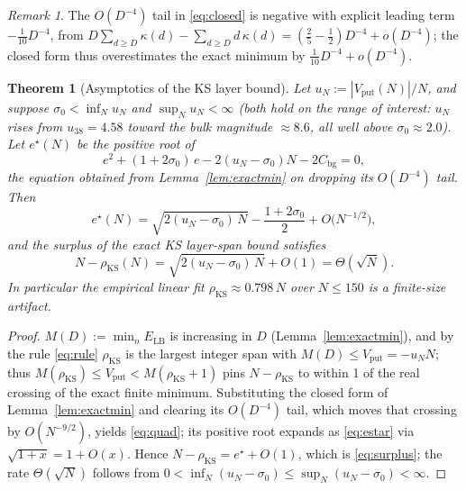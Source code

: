 \documentclass[11pt]{article}
\newtheorem{theorem}{Theorem}
\theoremstyle{remark}
\newtheorem{remark}{Remark}
\newcommand{\LB}{\mathrm{LB}}
\newcommand{\bg}{\mathrm{bg}}
\newcommand{\KS}{\mathrm{KS}}
\newcommand{\vput}{\mathrm{put}}
\begin{document}
\begin{remark}\label{rem:tail}
The $O(D^{-4})$ tail in \eqref{eq:closed} is negative with explicit leading term $-\tfrac1{10}D^{-4}$, from $D\sum_{d\ge D}\kappa(d)-\sum_{d\ge D} d\,\kappa(d)=(\tfrac25-\tfrac12)D^{-4}+o(D^{-4})$; the closed form thus overestimates the exact minimum by $\tfrac1{10}D^{-4}+o(D^{-4})$.
\end{remark}

\begin{theorem}[Asymptotics of the KS layer bound]\label{thm:asym}
Let $u_N:=|V_\vput(N)|/N$, and suppose $\sigma_0<\inf_N u_N$ and $\sup_N u_N<\infty$ (both hold on the range of interest: $u_N$ rises from $u_{38}=4.58$ toward the bulk magnitude $\approx8.6$, all well above $\sigma_0\approx2.0$). Let $e^\star(N)$ be the positive root of
\begin{equation}\label{eq:quad}
e^2 + (1+2\sigma_0)\,e - 2(u_N-\sigma_0)N - 2C_\bg = 0,
\end{equation}
the equation obtained from Lemma~\ref{lem:exactmin} on dropping its $O(D^{-4})$ tail. Then
\begin{equation}\label{eq:estar}
e^\star(N) = \sqrt{2(u_N-\sigma_0)\,N} - \frac{1+2\sigma_0}2 + O\bigl(N^{-1/2}\bigr),
\end{equation}
and the surplus of the exact KS layer-span bound satisfies
\begin{equation}\label{eq:surplus}
N-\rho_\KS(N) = \sqrt{2(u_N-\sigma_0)\,N} + O(1) = \Theta(\sqrt N).
\end{equation}
In particular the empirical linear fit $\rho_\KS\approx0.798\,N$ over $N\le150$ is a finite-size artifact.
\end{theorem}

\begin{proof}
$M(D):=\min_n E_\LB$ is increasing in $D$ (Lemma~\ref{lem:exactmin}), and by the rule \eqref{eq:rule} $\rho_\KS$ is the largest integer span with $M(D)\le V_\vput=-u_N N$; thus $M(\rho_\KS)\le V_\vput<M(\rho_\KS+1)$ pins $N-\rho_\KS$ to within 1 of the real crossing of the exact finite minimum. Substituting the closed form of Lemma~\ref{lem:exactmin} and clearing its $O(D^{-4})$ tail, which moves that crossing by $O(N^{-9/2})$, yields \eqref{eq:quad}; its positive root expands as \eqref{eq:estar} via $\sqrt{1+x}=1+O(x)$. Hence $N-\rho_\KS=e^\star+O(1)$, which is \eqref{eq:surplus}; the rate $\Theta(\sqrt N)$ follows from $0<\inf_N(u_N-\sigma_0)\le\sup_N(u_N-\sigma_0)<\infty$.
\end{proof}
\end{document}
